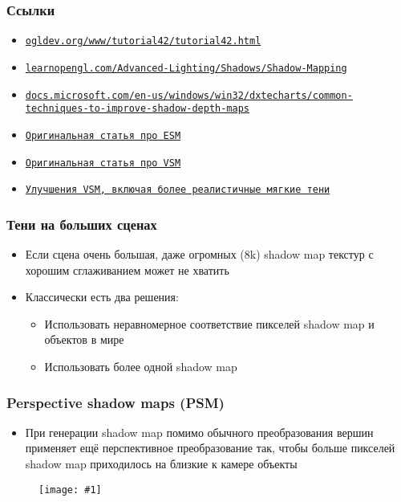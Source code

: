 \documentclass{beamer}
\newcommand{\slideimage}[1]{
  \begin{figure}
    \begin{adjustbox}{width=\textwidth, totalheight=\textheight-2\baselineskip-2\baselineskip,keepaspectratio}
      \texttt{[image: \#1]}
    \end{adjustbox}
  \end{figure}
}
\begin{document}
\begin{frame}[fragile]
\frametitle{Ссылки}
\begin{itemize}
\item \href{https://ogldev.org/www/tutorial42/tutorial42.html}{\texttt{ogldev.org/www/tutorial42/tutorial42.html}}
\item \href{https://learnopengl.com/Advanced-Lighting/Shadows/Shadow-Mapping}{\texttt{learnopengl.com/Advanced-Lighting/Shadows/Shadow-Mapping}}
\item \href{https://docs.microsoft.com/en-us/windows/win32/dxtecharts/common-techniques-to-improve-shadow-depth-maps}{\texttt{docs.microsoft.com/en-us/windows/win32/dxtecharts/common-techniques-to-improve-shadow-depth-maps}}
\item \href{https://jankautz.com/publications/esm_gi08.pdf}{\texttt{Оригинальная статья про ESM}}
\item \href{https://www.intel.com/content/dam/develop/external/us/en/documents/vsm-paper-182631.pdf}{\texttt{Оригинальная статья про VSM}}
\item \href{https://developer.nvidia.com/gpugems/gpugems3/part-ii-light-and-shadows/chapter-8-summed-area-variance-shadow-maps}{\texttt{Улучшения VSM, включая более реалистичные мягкие тени}}
\end{itemize}
\end{frame}

\begin{frame}[fragile]
\frametitle{Тени на больших сценах}
\begin{itemize}
\item Если сцена очень большая, даже огромных (8k) shadow map текстур с хорошим сглаживанием может не хватить
\pause
\item Классически есть два решения:
\begin{itemize}
\item Использовать неравномерное соответствие пикселей shadow map и объектов в мире
\item Использовать более одной shadow map
\end{itemize}
\end{itemize}
\end{frame}

\begin{frame}[fragile]
\frametitle{Perspective shadow maps (PSM)}
\begin{itemize}
\item При генерации shadow map помимо обычного преобразования вершин применяет ещё перспективное преобразование так, чтобы больше пикселей shadow map приходилось на близкие к камере объекты
\end{itemize}
\slideimage{psm.jpeg}
\end{frame}
\end{document}
